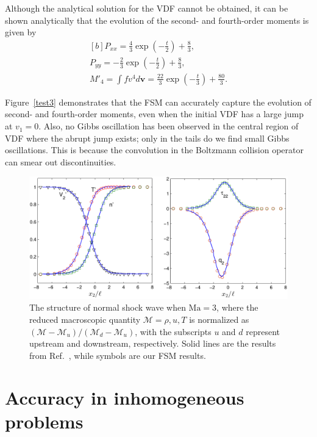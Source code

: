 Although the analytical solution for the VDF cannot be obtained, it can be shown analytically that the evolution of the second- and fourth-order moments is given by
\begin{equation}\label{initial_33}
\begin{aligned}[b]
  P_{xx} = \frac{4}{3}\exp\left(-\frac{t}{2}\right)+\frac{8}{3}, \\
  P_{yy} = -\frac{2}{3}\exp\left(-\frac{t}{2}\right)+\frac{8}{3}, \\
  M'_{4} = \int fv^4d\bm{v}=\frac{22}{3}\exp\left(-\frac{t}{3}\right)+\frac{80}{3}.
 \end{aligned}
\end{equation}


Figure~\ref{test3} demonstrates that the FSM can accurately capture the evolution of second- and fourth-order moments, even when the initial VDF has a large jump at $v_1=0$. Also, no Gibbs oscillation has been observed in the central region of VDF where the abrupt jump exists; only in the tails do we find small Gibbs oscillations. This is because the convolution in the Boltzmann collision operator can smear out discontinuities.


\begin{figure}[t]
	\centering
	\includegraphics[scale=0.7]{Chapter4/IMG/shock_hard_M3.pdf}
	\caption{
		The structure of normal shock wave when $\text{Ma}=3$, where the reduced macroscopic quantity $\mathcal{M}=\rho, u, T$ is normalized as ${(\mathcal{M}-\mathcal{M}_u)/(\mathcal{M}_d-\mathcal{M}_u)}$, with the subscripts ${u}$ and ${d}$ represent upstream and downstream, respectively. Solid lines are the results from Ref.~\cite{Ohwada1993}, while symbols are our FSM results. 
	}
	\label{shock_Ohwada}
\end{figure}

\section{Accuracy in inhomogeneous problems}\label{CIS_first_time}


